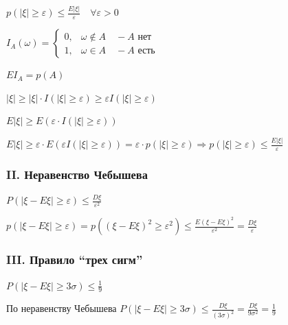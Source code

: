\documentclass[12pt]{article}
\begin{document}
    \begin{MyTheorem}
        \Ths $p(|\xi| \geq \varepsilon) \leq \frac{E|\xi|}{\varepsilon} \quad \forall \varepsilon > 0$
    \end{MyTheorem}

    \begin{MyProof}
        $I_A(\omega) = \begin{cases}0, & \omega \notin A \quad - A\text{ нет} \\ 1, & \omega \in A \quad - A\text{ есть}\end{cases}$

        $EI_A = p(A)$

        $|\xi| \geq |\xi| \cdot I(|\xi| \geq \varepsilon) \geq \varepsilon I(|\xi| \geq \varepsilon)$

        $E|\xi| \geq E(\varepsilon \cdot I(|\xi| \geq \varepsilon))$

        $E|\xi| \geq \varepsilon \cdot E(\varepsilon I(|\xi| \geq \varepsilon)) = \varepsilon \cdot p(|\xi| \geq \varepsilon) 
        \Longrightarrow p(|\xi| \geq \varepsilon) \leq \frac{E|\xi|}{\varepsilon}$
    \end{MyProof}

    \subsubsection{II. Неравенство Чебышева}

    \begin{MyTheorem}
        \Ths $P(|\xi - E\xi| \geq \varepsilon) \leq \frac{D\xi}{\varepsilon^2}$
    \end{MyTheorem}

    \begin{MyProof}
        $p(|\xi - E\xi| \geq \varepsilon) = p((\xi - E\xi)^2 \geq \varepsilon^2) \leq \frac{E(\xi - E\xi)^2}{\varepsilon^2} = \frac{D\xi}{\varepsilon}$
    \end{MyProof}

    \subsubsection{III. Правило \enquote{трех сигм}}
    
    \begin{MyTheorem}
        \Ths $P(|\xi - E\xi| \geq 3\sigma) \leq \frac{1}{9}$
    \end{MyTheorem}

    \begin{MyProof}
        По неравенству Чебышева $P(|\xi - E\xi| \geq 3\sigma) \leq \frac{D\xi}{(3\sigma)^2} = \frac{D\xi}{9\sigma^2} = \frac{1}{9}$
    \end{MyProof}
\end{document}
